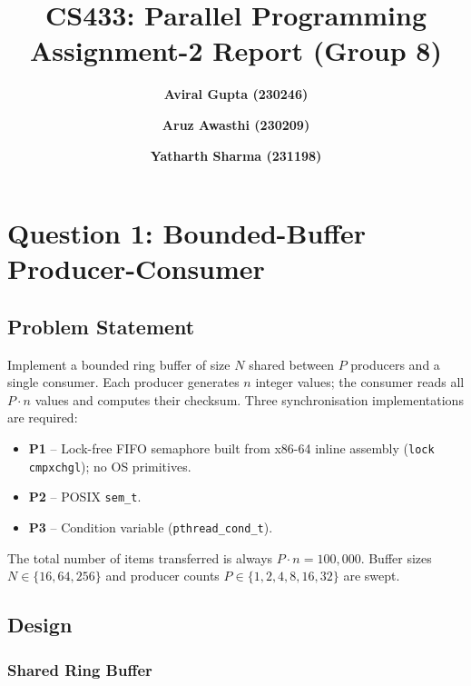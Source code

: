\documentclass{article}
\begin{document}
\vspace{-2cm}
\title{\Huge \textbf{CS433: Parallel Programming \\ Assignment-2 Report (Group 8)}}

\author{
    \LARGE \textbf{Aviral Gupta (230246)}\\
    \and
    \LARGE \textbf{Aruz Awasthi (230209)}\\
    \and
    \LARGE \textbf{Yatharth Sharma (231198)}
}

\maketitle

\section{Question 1: Bounded-Buffer Producer-Consumer}

\subsection{Problem Statement}

Implement a bounded ring buffer of size $N$ shared between $P$ producers
and a single consumer. Each producer generates $n$ integer values; the
consumer reads all $P \cdot n$ values and computes their checksum.
Three synchronisation implementations are required:
\begin{itemize}
    \item \textbf{P1} -- Lock-free FIFO semaphore built from x86-64 inline assembly
    (\texttt{lock cmpxchgl}); no OS primitives.
    \item \textbf{P2} -- POSIX \texttt{sem\_t}.
    \item \textbf{P3} -- Condition variable (\texttt{pthread\_cond\_t}).
\end{itemize}
The total number of items transferred is always $P \cdot n = 100{,}000$.
Buffer sizes $N \in \{16, 64, 256\}$ and producer counts $P \in \{1, 2, 4, 8, 16, 32\}$ are swept.

\subsection{Design}

\subsubsection{Shared Ring Buffer}
\end{document}
